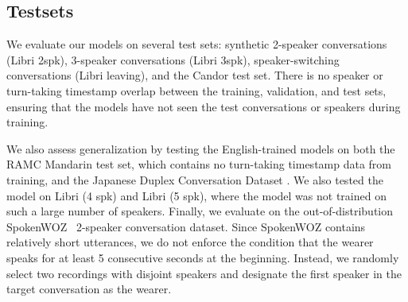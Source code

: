 

\subsection{Testsets}\label{sec:testsets}
We evaluate our models on several test sets: synthetic 2-speaker conversations (Libri 2spk), 3-speaker conversations (Libri 3spk), speaker-switching conversations (Libri leaving), and the Candor test set. There is no speaker {or turn-taking timestamp} overlap between the training, validation, and test sets, ensuring that the models have not seen the test conversations or speakers during training.


We also assess generalization by testing the English-trained models on both the RAMC Mandarin test set, which contains no turn-taking timestamp data from training, {and the Japanese Duplex Conversation Dataset \cite{JapaneseDuplex2025}. We also tested the model on Libri (4 spk) and Libri (5 spk), where the model was not trained on such a large number of speakers.} Finally, we evaluate on the out-of-distribution SpokenWOZ~\cite{si2023spokenwoz} 2-speaker conversation dataset. Since SpokenWOZ contains relatively short utterances, we do not enforce the condition that the wearer speaks for at least 5 consecutive seconds at the beginning. Instead, we randomly select two recordings with disjoint speakers and designate the first speaker in the target conversation as the wearer. 



